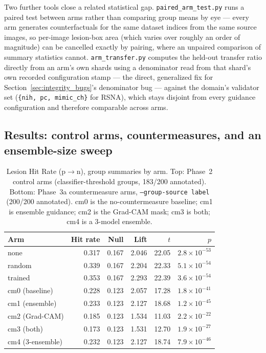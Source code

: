 \documentclass[11pt]{article}
\begin{document}
Two further tools close a related statistical gap. \texttt{paired\_arm\_test.py}
runs a paired test between arms rather than comparing group means by eye —
every arm generates counterfactuals for the same dataset indices from the
same source images, so per-image lesion-box area (which varies over
roughly an order of magnitude) can be cancelled exactly by pairing, where
an unpaired comparison of summary statistics cannot.
\texttt{arm\_transfer.py} computes the held-out transfer ratio directly
from an arm's own shards using a denominator read from that shard's own
recorded configuration stamp — the direct, generalized fix for
Section~\ref{sec:integrity_bugs}'s denominator bug — against the domain's
validator set (\texttt{\{nih, pc, mimic\_ch\}} for RSNA), which stays
disjoint from every guidance configuration and therefore comparable across
arms.

\subsection{Results: control arms, countermeasures, and an ensemble-size sweep}

\begin{table}[h]
\centering
\caption{Lesion Hit Rate (p$\to$n), group summaries by arm. Top: Phase~2
control arms (classifier-threshold groups, 183/200 annotated). Bottom:
Phase~3a countermeasure arms, \texttt{--group-source label} (200/200
annotated). cm0 is the no-countermeasure baseline; cm1 is ensemble
guidance; cm2 is the Grad-CAM mask; cm3 is both; cm4 is a 3-model ensemble.}
\label{tab:lhr_arms}
\begin{tabular}{@{}lrrrrr@{}}
\toprule
\textbf{Arm} & \textbf{Hit rate} & \textbf{Null} & \textbf{Lift} & \textbf{$t$} & \textbf{$p$} \\
\midrule
none            & 0.317 & 0.167 & 2.046 & 22.05 & $2.8\times10^{-53}$ \\
random          & 0.339 & 0.167 & 2.204 & 22.33 & $5.1\times10^{-54}$ \\
trained         & 0.353 & 0.167 & 2.293 & 22.39 & $3.6\times10^{-54}$ \\
\midrule
cm0 (baseline)   & 0.228 & 0.123 & 2.057 & 17.28 & $1.8\times10^{-41}$ \\
cm1 (ensemble)   & 0.233 & 0.123 & 2.127 & 18.68 & $1.2\times10^{-45}$ \\
cm2 (Grad-CAM)   & 0.185 & 0.123 & 1.534 & 11.03 & $2.2\times10^{-22}$ \\
cm3 (both)       & 0.173 & 0.123 & 1.531 & 12.70 & $1.9\times10^{-27}$ \\
cm4 (3-ensemble) & 0.232 & 0.123 & 2.127 & 18.74 & $7.9\times10^{-46}$ \\
\bottomrule
\end{tabular}
\end{table}
\end{document}
